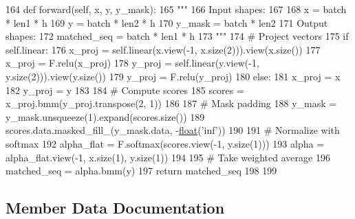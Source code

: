 \begin{DoxyCode}
164     \textcolor{keyword}{def }forward(self, x, y, y\_mask):
165         \textcolor{stringliteral}{"""}
166 \textcolor{stringliteral}{        Input shapes:}
167 \textcolor{stringliteral}{}
168 \textcolor{stringliteral}{            x = batch * len1 * h}
169 \textcolor{stringliteral}{            y = batch * len2 * h}
170 \textcolor{stringliteral}{            y\_mask = batch * len2}
171 \textcolor{stringliteral}{        Output shapes:}
172 \textcolor{stringliteral}{            matched\_seq = batch * len1 * h}
173 \textcolor{stringliteral}{        """}
174         \textcolor{comment}{# Project vectors}
175         \textcolor{keywordflow}{if} self.linear:
176             x\_proj = self.linear(x.view(-1, x.size(2))).view(x.size())
177             x\_proj = F.relu(x\_proj)
178             y\_proj = self.linear(y.view(-1, y.size(2))).view(y.size())
179             y\_proj = F.relu(y\_proj)
180         \textcolor{keywordflow}{else}:
181             x\_proj = x
182             y\_proj = y
183 
184         \textcolor{comment}{# Compute scores}
185         scores = x\_proj.bmm(y\_proj.transpose(2, 1))
186 
187         \textcolor{comment}{# Mask padding}
188         y\_mask = y\_mask.unsqueeze(1).expand(scores.size())
189         scores.data.masked\_fill\_(y\_mask.data, -\hyperlink{namespaceprojects_1_1controllable__dialogue_1_1make__control__dataset_aa2b7207688c641dbc094ab44eca27113}{float}(\textcolor{stringliteral}{'inf'}))
190 
191         \textcolor{comment}{# Normalize with softmax}
192         alpha\_flat = F.softmax(scores.view(-1, y.size(1)))
193         alpha = alpha\_flat.view(-1, x.size(1), y.size(1))
194 
195         \textcolor{comment}{# Take weighted average}
196         matched\_seq = alpha.bmm(y)
197         \textcolor{keywordflow}{return} matched\_seq
198 
199 
\end{DoxyCode}


\subsection{Member Data Documentation}
\mbox{\label{classparlai_1_1agents_1_1drqa_1_1layers_1_1SeqAttnMatch_a6332862a9596fe3e4cb3c323b818a42f}} 
